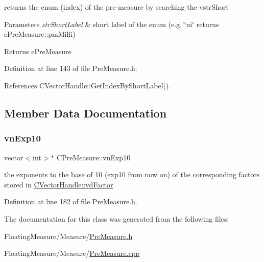 returns the enum (index) of the pre-\/measure by searching the vstr\+Short 


\begin{DoxyParams}{Parameters}
{\em str\+Short\+Label} & short label of the enum (e.\+g. \char`\"{}m\char`\"{} returns e\+Pre\+Measure\+::pm\+Milli) \\
\hline
\end{DoxyParams}
\begin{DoxyReturn}{Returns}
e\+Pre\+Measure 
\end{DoxyReturn}


Definition at line 143 of file Pre\+Measure.\+h.



References C\+Vector\+Handle\+::\+Get\+Index\+By\+Short\+Label().



\subsection{Member Data Documentation}
\mbox{\label{classCPreMeasure_a2c50eadae55427f0d77a013b3fab0fdb}} 
\subsubsection{\texorpdfstring{vn\+Exp10}{vnExp10}}
{\footnotesize\ttfamily vector$<$int$>$$\ast$ C\+Pre\+Measure\+::vn\+Exp10\hspace{0.3cm}{\ttfamily [protected]}}



the exponents to the base of 10 (exp10 from now on) of the corresponding factors stored in \hyperlink{classCVectorHandle_af8f8b2e0da8363e695872ca85f33364e}{C\+Vector\+Handle\+::vd\+Factor} 



Definition at line 182 of file Pre\+Measure.\+h.



The documentation for this class was generated from the following files\+:\begin{DoxyCompactItemize}
\item 
Floating\+Measure/\+Measure/\hyperlink{PreMeasure_8h}{Pre\+Measure.\+h}\item 
Floating\+Measure/\+Measure/\hyperlink{PreMeasure_8cpp}{Pre\+Measure.\+cpp}\end{DoxyCompactItemize}

